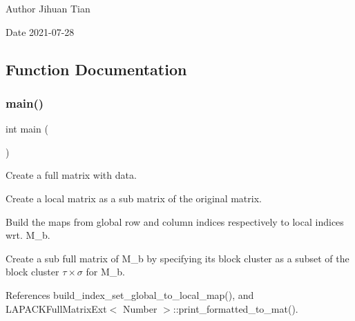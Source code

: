 \begin{DoxyAuthor}{Author}
Jihuan Tian 
\end{DoxyAuthor}
\begin{DoxyDate}{Date}
2021-\/07-\/28 
\end{DoxyDate}


\subsection{Function Documentation}
\mbox{\label{lapack-matrix-local-to-submatrix_8cc_ae66f6b31b5ad750f1fe042a706a4e3d4}} 
\subsubsection{\texorpdfstring{main()}{main()}}
{\footnotesize\ttfamily int main (\begin{DoxyParamCaption}{ }\end{DoxyParamCaption})}

Create a full matrix with data.

Create a local matrix as a sub matrix of the original matrix.

Build the maps from global row and column indices respectively to local indices wrt. M\+\_\+b.

Create a sub full matrix of {\ttfamily M\+\_\+b} by specifying its block cluster as a subset of the block cluster $\tau \times \sigma$ for {\ttfamily M\+\_\+b}.

References build\+\_\+index\+\_\+set\+\_\+global\+\_\+to\+\_\+local\+\_\+map(), and L\+A\+P\+A\+C\+K\+Full\+Matrix\+Ext$<$ Number $>$\+::print\+\_\+formatted\+\_\+to\+\_\+mat().

